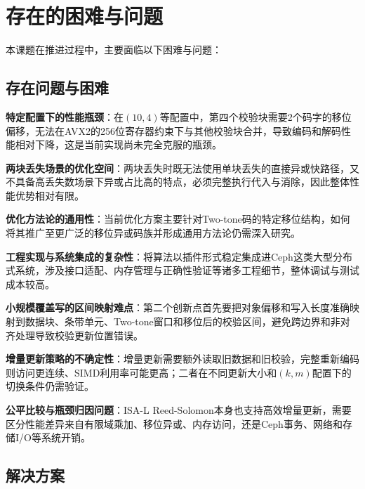 \section{存在的困难与问题}

本课题在推进过程中，主要面临以下困难与问题：

\subsection{存在问题与困难}

\begin{semiQuotList}
    \item \textbf{特定配置下的性能瓶颈}：在$(10,4)$等配置中，第四个校验块需要2个码字的移位偏移，无法在AVX2的256位寄存器约束下与其他校验块合并，导致编码和解码性能相对下降，这是当前实现尚未完全克服的瓶颈。
    \item \textbf{两块丢失场景的优化空间}：两块丢失时既无法使用单块丢失的直接异或快路径，又不具备高丢失数场景下异或占比高的特点，必须完整执行代入与消除，因此整体性能优势相对有限。
    \item \textbf{优化方法论的通用性}：当前优化方案主要针对Two-tone码的特定移位结构，如何将其推广至更广泛的移位异或码族并形成通用方法论仍需深入研究。
    \item \textbf{工程实现与系统集成的复杂性}：将算法以插件形式稳定集成进Ceph这类大型分布式系统，涉及接口适配、内存管理与正确性验证等诸多工程细节，整体调试与测试成本较高。
    \item \textbf{小规模覆盖写的区间映射难点}：第二个创新点首先要把对象偏移和写入长度准确映射到数据块、条带单元、Two-tone窗口和移位后的校验区间，避免跨边界和非对齐处理导致校验更新位置错误。
    \item \textbf{增量更新策略的不确定性}：增量更新需要额外读取旧数据和旧校验，完整重新编码则访问更连续、SIMD利用率可能更高；二者在不同更新大小和$(k,m)$配置下的切换条件仍需验证。
    \item \textbf{公平比较与瓶颈归因问题}：ISA-L Reed-Solomon本身也支持高效增量更新，需要区分性能差异来自有限域乘加、移位异或、内存访问，还是Ceph事务、网络和存储I/O等系统开销。
\end{semiQuotList}

\subsection{解决方案}

